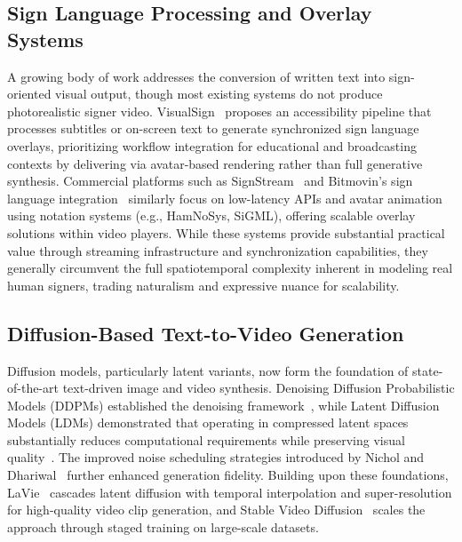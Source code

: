 \documentclass{ieeeaccess}
\begin{document}
\subsection{Sign Language Processing and Overlay Systems}

A growing body of work addresses the conversion of written text into sign-oriented visual output, though most existing systems do not produce photorealistic signer video. VisualSign~\cite{springer2024visualsign} proposes an accessibility pipeline that processes subtitles or on-screen text to generate synchronized sign language overlays, prioritizing workflow integration for educational and broadcasting contexts by delivering via avatar-based rendering rather than full generative synthesis. Commercial platforms such as SignStream~\cite{signapse2025signstream} and Bitmovin's sign language integration~\cite{bitmovin2024signlanguage} similarly focus on low-latency APIs and avatar animation using notation systems (e.g., HamNoSys, SiGML), offering scalable overlay solutions within video players. While these systems provide substantial practical value through streaming infrastructure and synchronization capabilities, they generally circumvent the full spatiotemporal complexity inherent in modeling real human signers, trading naturalism and expressive nuance for scalability.

\subsection{Diffusion-Based Text-to-Video Generation}

Diffusion models, particularly latent variants, now form the foundation of state-of-the-art text-driven image and video synthesis. Denoising Diffusion Probabilistic Models (DDPMs) established the denoising framework~\cite{ho2020ddpm}, while Latent Diffusion Models (LDMs) demonstrated that operating in compressed latent spaces substantially reduces computational requirements while preserving visual quality~\cite{rombach2022ldm}. The improved noise scheduling strategies introduced by Nichol and Dhariwal~\cite{nichol2021improved} further enhanced generation fidelity. Building upon these foundations, LaVie~\cite{zhang2023lavie} cascades latent diffusion with temporal interpolation and super-resolution for high-quality video clip generation, and Stable Video Diffusion~\cite{blattmann2023svd} scales the approach through staged training on large-scale datasets.
\end{document}
